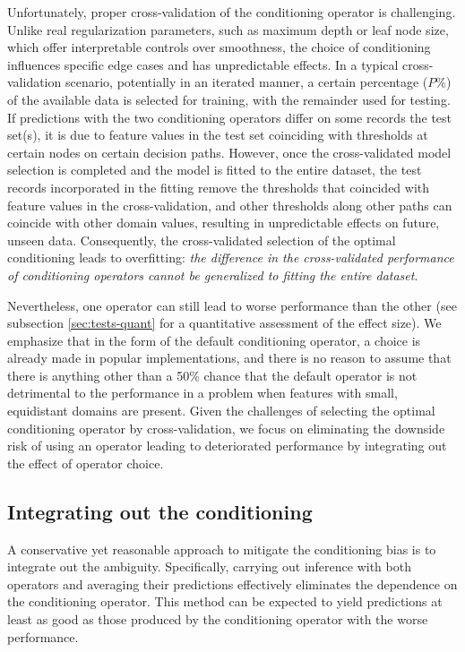 \documentclass[sn-mathphys]{sn-jnl}%
\theoremstyle{thmstyleone}%
\theoremstyle{thmstyletwo}%
\theoremstyle{thmstylethree}%
\begin{document}
Unfortunately, proper cross-validation of the conditioning operator is challenging. Unlike real regularization parameters, such as maximum depth or leaf node size, which offer interpretable controls over smoothness, the choice of conditioning influences specific edge cases and has unpredictable effects. In a typical cross-validation scenario, potentially in an iterated manner, a certain percentage ($P\%$) of the available data is selected for training, with the remainder used for testing. If predictions with the two conditioning operators differ on some records the test set(s), it is due to feature values in the test set coinciding with thresholds at certain nodes on certain decision paths. However, once the cross-validated model selection is completed and the model is fitted to the entire dataset, the test records incorporated in the fitting remove the thresholds that coincided with feature values in the cross-validation, and other thresholds along other paths can coincide with other domain values, resulting in unpredictable effects on future, unseen data. Consequently, the cross-validated selection of the optimal conditioning leads to overfitting: \emph{the difference in the cross-validated performance of conditioning operators cannot be generalized to fitting the entire dataset}.

Nevertheless, one operator can still lead to worse performance than the other (see subsection \ref{sec:tests-quant} for a quantitative assessment of the effect size). We emphasize that in the form of the default conditioning operator, a choice is already made in popular implementations, and there is no reason to assume that there is anything other than a 50\% chance that the default operator is not detrimental to the performance in a problem when features with small, equidistant domains are present. Given the challenges of selecting the optimal conditioning operator by cross-validation, we focus on eliminating the downside risk of using an operator leading to deteriorated performance by integrating out the effect of operator choice.

\subsection{Integrating out the conditioning}
\label{sec:integrate}

A conservative yet reasonable approach to mitigate the conditioning bias is to integrate out the ambiguity. 
Specifically, carrying out inference with both operators and averaging their predictions effectively eliminates the dependence on the conditioning operator. This method can be expected to yield predictions at least as good as those produced by the conditioning operator with the worse performance.
\end{document}
